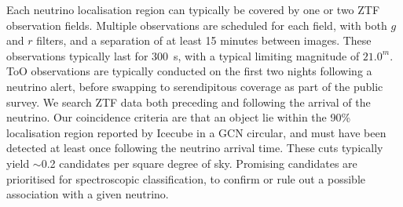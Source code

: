 Each neutrino localisation region can typically be covered by one or two ZTF observation fields. Multiple observations are scheduled for each field, with both $g$ and $r$ filters, and a separation of at least 15 minutes between images. These observations typically last for 300~s, with a typical limiting magnitude of $21.0^{m}$.  ToO observations are typically conducted on the first two nights following a neutrino alert, before swapping to serendipitous coverage as part of the public survey. We search ZTF data both preceding and following the arrival of the neutrino. Our coincidence criteria are that an object lie within the 90\% localisation region reported by Icecube in a GCN circular, and must have been detected at least once following the neutrino arrival time. These cuts typically yield $\sim$0.2 candidates per square degree of sky. Promising candidates are prioritised for spectroscopic classification, to confirm or rule out a possible association with a given neutrino.  
